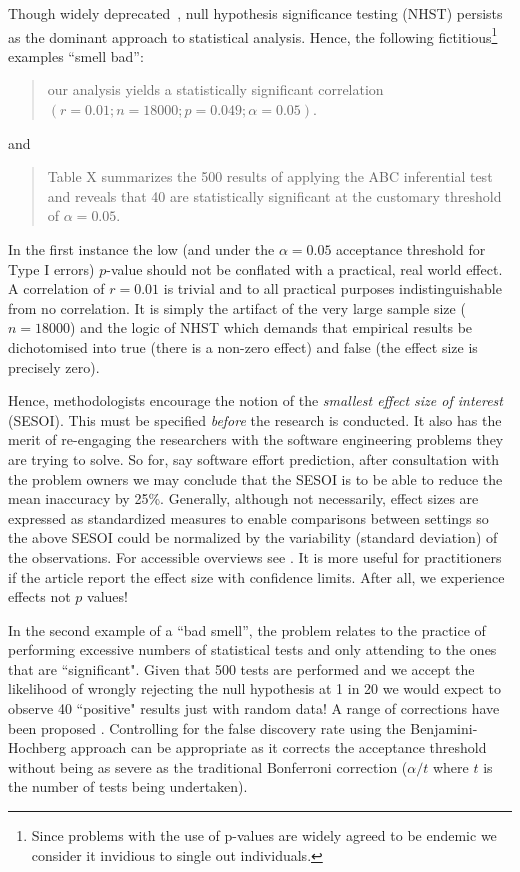 \documentclass[preprint,10pt]{elsarticle}
\begin{document}
Though widely deprecated~\cite{carver93,Simm11,Colq14},
 null hypothesis significance testing (NHST) persists as the dominant approach to statistical analysis. Hence, the following fictitious\footnote{Since problems with the use of p-values are widely agreed to be endemic \cite{Simm11,Jorg16} we consider it invidious to single out individuals.} examples ``smell bad'':
\begin{quote}
    our analysis yields a statistically significant correlation $(r = 0.01;n = 18000;p = 0.049;\alpha = 0.05)$.
\end{quote}

and

\begin{quote}
    Table X summarizes the 500 results of applying the ABC inferential test and reveals that 40 are statistically significant at the customary threshold of $\alpha=0.05$.
\end{quote}

\noindent
In the first instance the low (and under the $\alpha=0.05$ acceptance threshold for Type I errors)  $p$-value should not be conflated with a practical, real world effect.   A correlation of $r=0.01$ is trivial and to all practical purposes indistinguishable from no correlation.  It is simply the artifact of the very large sample size ($n=18000$) and the logic of NHST which demands that empirical results be dichotomised into true (there is a non-zero effect) and false (the effect size is precisely zero).  

Hence, methodologists encourage the notion of the {\em smallest effect size of interest} (SESOI).  This must be specified \textit{before} the research is conducted.  It also has the merit of re-engaging the researchers with the software engineering problems they are trying to solve.  So for, say software effort prediction, after consultation with the problem owners we may conclude that the SESOI is to be able to reduce the mean inaccuracy by 25\%. Generally, although not necessarily, effect sizes are expressed as standardized measures to enable comparisons between settings so the above SESOI could be normalized by the variability (standard deviation) of the observations. For accessible overviews see \cite{Elli10,Cohe92}.   It is more useful for practitioners if the article report the effect size with confidence limits.  After all, we experience effects not $p$ values!
 
In the second example of a ``bad smell'', the problem relates to the practice of performing excessive numbers of statistical tests and only attending to the ones that are ``significant".  Given that 500 tests are performed and we accept the likelihood of wrongly rejecting the null hypothesis at 1 in 20 we would expect to observe 40 ``positive" results just with random data!  A range of corrections have been proposed \cite{Bend01}.  Controlling for the false discovery rate using the Benjamini-Hochberg approach \cite{Benj01} can be appropriate as it corrects the acceptance threshold without being as severe as the traditional Bonferroni correction ($\alpha / t$ where $t$ is the number of tests being undertaken).
\end{document}
